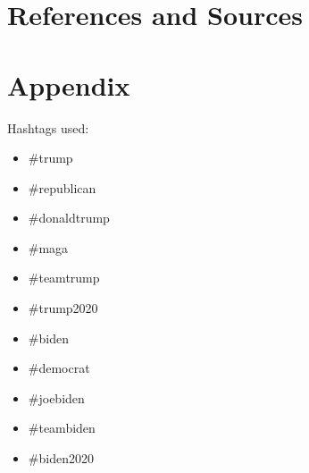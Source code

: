 \documentclass[11pt, oneside]{article}
\begin{document}
\pagebreak
\section{References and Sources}


\pagebreak
\section{Appendix}
Hashtags used:
\begin{itemize}
	\item \#trump
    \item \#republican
    \item \#donaldtrump
    \item \#maga
    \item \#teamtrump
    \item \#trump2020 
    \item \#biden
    \item \#democrat
    \item \#joebiden
    \item \#teambiden
    \item \#biden2020
\end{itemize}
\end{document}
